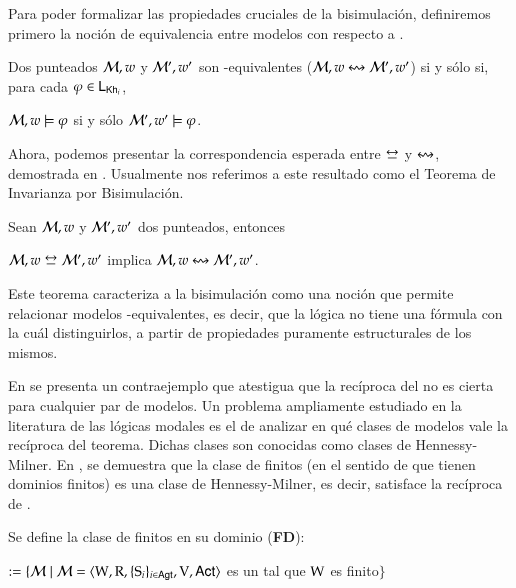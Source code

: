 Para poder formalizar las propiedades cruciales de la bisimulación, definiremos primero la noción de 
equivalencia entre modelos con respecto a \KHilogic.

\begin{definicion}
    Dos \ultss punteados $\mathcal{M},w$ y $\mathcal{M}',w'$ son \KHilogic-equivalentes ($\mathcal{M}, w \mathrel{\leftrightsquigarrow} \mathcal{M}', w'$)
    si y sólo si, para cada $\varphi \in \mathsf{L}_{\mathsf{Kh}_i}$,
    \begin{center}
        $\mathcal{M}, w \models \varphi$ \quad si y sólo \quad $\mathcal{M}', w' \models \varphi$.
    \end{center} 
\end{definicion}

Ahora, podemos presentar la correspondencia esperada entre $\bisim$ y $\mathrel{\leftrightsquigarrow}$, demostrada en \cite{ArecesFSV25,SaraviaPHD}.
Usualmente nos referimos a este resultado como el Teorema de Invarianza por Bisimulación.

\begin{teorema}\label{thm:bisim-implies-equivalence}
    Sean $\mathcal{M},w$ y $\mathcal{M}',w'$ dos \ultss punteados, entonces
    \begin{center}
        $\modults,w \bisim \modults',w'$ implica $\mathcal{M},w \mathrel{\leftrightsquigarrow} \mathcal{M}',w'$.
    \end{center}
\end{teorema}

Este teorema caracteriza a la bisimulación como una noción que permite relacionar modelos \KHilogic-equivalentes, es decir, que la lógica no tiene una fórmula con la cuál distinguirlos,
a partir de propiedades puramente estructurales de los mismos.

En \cite[Sección 2]{FervariVQW21} se presenta un contraejemplo que atestigua que la recíproca del  
no es cierta para cualquier par de modelos. Un problema ampliamente estudiado en la literatura de las lógicas modales es el de analizar 
en qué clases de modelos vale la recíproca del teorema. Dichas clases son conocidas como clases de Hennessy-Milner.
En \cite{ArecesFSV25,SaraviaPHD}, se demuestra que la clase de \ults finitos (en el sentido de que tienen dominios finitos) es una clase 
de Hennessy-Milner, es decir, satisface la recíproca de .

\begin{definicion}\label{def:finite-ults}
    Se define la clase de \ultss finitos en su dominio (\textbf{FD}):
    \begin{center}
        \MFD $:= \{\mathcal{M} \mid \mathcal{M} = \langle \mathrm{W},\mathrm{R},\{\mathrm{S}_i\}_{i\in{\rm \sf Agt}},\mathrm{V},{\rm \sf Act} \rangle$ es un \ults tal que $\mathrm{W}$ es finito$\}$
    \end{center}

\end{definicion}


